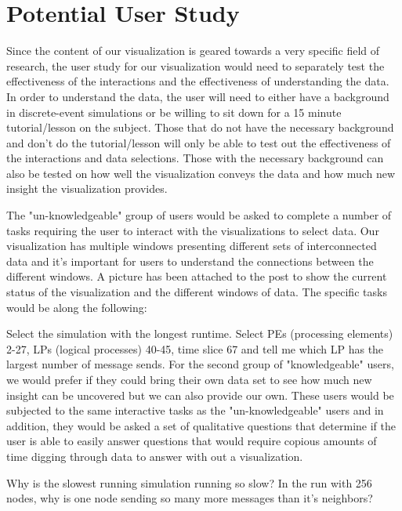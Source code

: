 \documentclass{acm_proc_article-sp}
\begin{document}
\section{Potential User Study}
Since the content of our visualization is geared towards a very specific field of research, the user study for our visualization would need to separately test the effectiveness of the interactions and the effectiveness of understanding the data. In order to understand the data, the user will need to either have a background in discrete-event simulations or be willing to sit down for a 15 minute tutorial/lesson on the subject. Those that do not have the necessary background and don't do the tutorial/lesson will only be able to test out the effectiveness of the interactions and data selections. Those with the necessary background can also be tested on how well the visualization conveys the data and how much new insight the visualization provides.

The "un-knowledgeable" group of users would be asked to complete a number of tasks requiring the user to interact with the visualizations to select data. Our visualization has multiple windows presenting different sets of interconnected data and it's important for users to understand the connections between the different windows. A picture has been attached to the post to show the current status of the visualization and the different windows of data. The specific tasks would be along the following:

Select the simulation with the longest runtime. Select PEs (processing elements) 2-27,  LPs (logical processes) 40-45, time slice 67 and tell me which LP has the largest number of message sends.
For the second group of "knowledgeable" users, we would prefer if they could bring their own data set to see how much new insight can be uncovered but we can also provide our own. These users would be subjected to the same interactive tasks as the "un-knowledgeable" users and in addition, they would be asked a set of qualitative questions that determine if the user is able to easily answer questions that would require copious amounts of time digging through data to answer with out a visualization.

Why is the slowest running simulation running so slow?
In the run with 256 nodes, why is one node sending so many more messages than it's neighbors?
\end{document}

